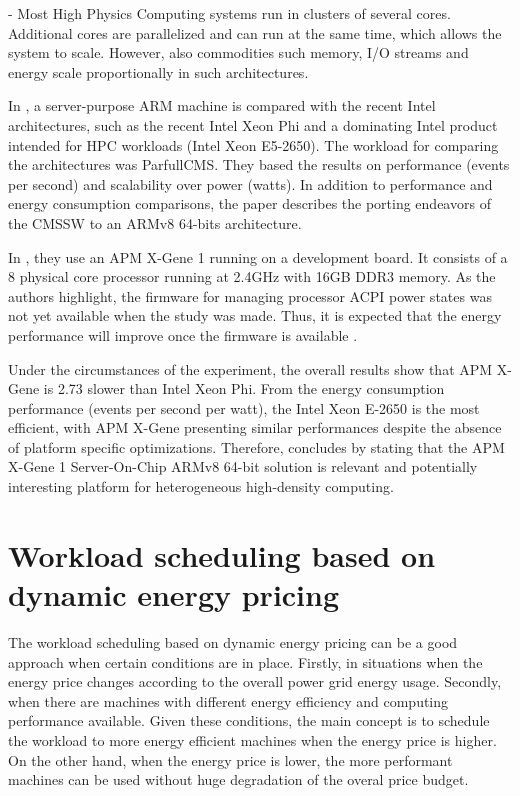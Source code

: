 - Most High Physics Computing systems run in clusters of several cores.
Additional cores are parallelized and can run at the same time, which allows the
system to scale. However, also commodities such memory, I/O streams and energy
scale proportionally in such architectures.
 

% 
In \cite{ACAT14ARMDAVID}, a server-purpose ARM machine is compared with the recent
Intel architectures, such as the recent Intel Xeon Phi and a dominating Intel product
intended for HPC workloads (Intel Xeon E5-2650). The workload for comparing
the architectures was ParfullCMS. They based the results on performance (events per
second) and scalability over power (watts). In addition to performance and energy
consumption comparisons, the paper describes the porting endeavors of the CMSSW to
an ARMv8 64-bits architecture.


In \cite{ACAT14ARMDAVID}, they use an APM X-Gene 1 running on a development board. 
It consists of a 8 physical core processor running at 2.4GHz with 16GB DDR3 memory.
As the authors highlight, the firmware for managing processor ACPI power states was
not yet available when the study was made. Thus, it is expected that the energy 
performance will improve once the firmware is available \cite{ACAT14ARMDAVID}.

Under the circumstances of the experiment, the overall results show that APM X-Gene 
is 2.73 slower than Intel Xeon Phi. From the energy consumption performance (events
per second per watt), the Intel Xeon E-2650 is the most efficient, with APM X-Gene
presenting similar performances despite the absence of platform specific 
optimizations. Therefore, \cite{ACAT14ARMDAVID} concludes by stating that the APM
X-Gene 1 Server-On-Chip ARMv8 64-bit solution is relevant and potentially interesting
platform for heterogeneous high-density computing. 


\section{Workload scheduling based on dynamic energy pricing}

The workload scheduling based on dynamic energy pricing can be a good approach when certain conditions are in place. Firstly, in situations when the energy price changes according to the overall power grid energy usage. Secondly, when there are machines with different energy efficiency and computing performance available. Given these conditions, the main concept is to schedule the workload to more energy efficient machines when the energy price is higher. On the other hand, when the energy price is lower, the more performant machines can be used without huge degradation of the overal price budget.

